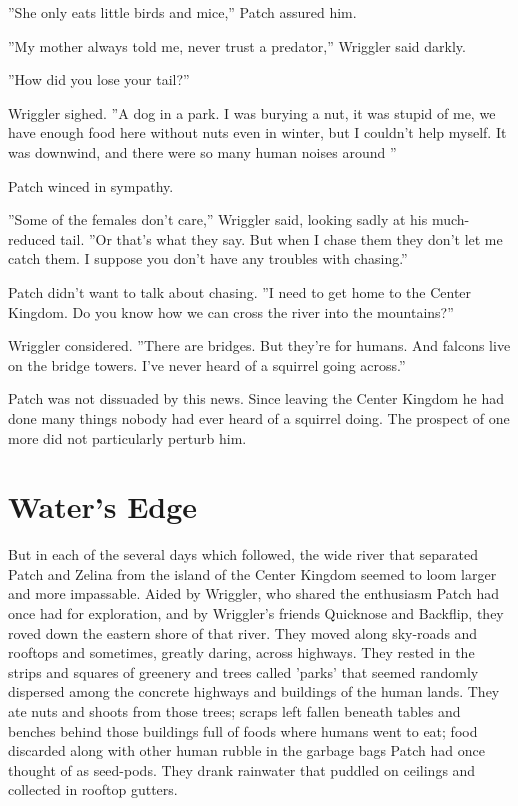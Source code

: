 \documentclass[12pt]{book}
\begin{document}
''She only eats little birds and mice,'' Patch assured him.

''My mother always told me, never trust a predator,'' Wriggler said darkly.

''How did you lose your tail?''

Wriggler sighed. ''A dog in a park. I was burying a nut, it was stupid of me, we have enough food here without nuts even in winter, but I couldn't help myself. It was downwind, and there were so many human noises around%
''

Patch winced in sympathy.

''Some of the females don't care,'' Wriggler said, looking sadly at his much-reduced tail. ''Or that's what they say. But when I chase them they don't let me catch them. I suppose you don't have any troubles with chasing.''

Patch didn't want to talk about chasing. ''I need to get home to the Center Kingdom. Do you know how we can cross the river into the mountains?''

Wriggler considered. ''There are bridges. But they're for humans. And falcons live on the bridge towers. I've never heard of a squirrel going across.''

Patch was not dissuaded by this news. Since leaving the Center Kingdom he had done many things nobody had ever heard of a squirrel doing. The prospect of one more did not particularly perturb him.


\section{Water's Edge}

But in each of the several days which followed, the wide river that separated Patch and Zelina from the island of the Center Kingdom seemed to loom larger and more impassable. Aided by Wriggler, who shared the enthusiasm Patch had once had for exploration, and by Wriggler's friends Quicknose and Backflip, they roved down the eastern shore of that river. They moved along sky-roads and rooftops and sometimes, greatly daring, across highways. They rested in the strips and squares of greenery and trees called 'parks' that seemed randomly dispersed among the concrete highways and buildings of the human lands. They ate nuts and shoots from those trees; scraps left fallen beneath tables and benches behind those buildings full of foods where humans went to eat; food discarded along with other human rubble in the garbage bags Patch had once thought of as seed-pods. They drank rainwater that puddled on ceilings and collected in rooftop gutters.
\end{document}
